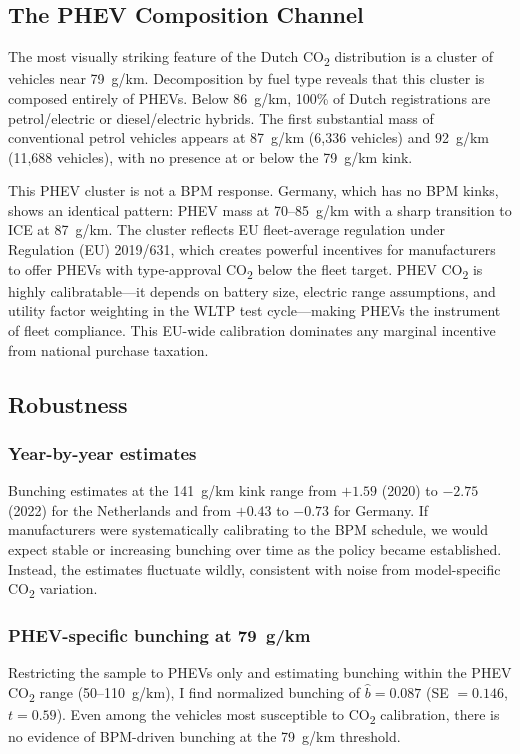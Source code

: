 \documentclass[12pt]{article}
\begin{document}


\subsection{The PHEV Composition Channel}

The most visually striking feature of the Dutch CO\textsubscript{2} distribution is a cluster of vehicles near 79~g/km. Decomposition by fuel type reveals that this cluster is composed entirely of PHEVs. Below 86~g/km, 100\% of Dutch registrations are petrol/electric or diesel/electric hybrids. The first substantial mass of conventional petrol vehicles appears at 87~g/km (6,336 vehicles) and 92~g/km (11,688 vehicles), with no presence at or below the 79~g/km kink.

This PHEV cluster is not a BPM response. Germany, which has no BPM kinks, shows an identical pattern: PHEV mass at 70--85~g/km with a sharp transition to ICE at 87~g/km. The cluster reflects EU fleet-average regulation under Regulation (EU) 2019/631, which creates powerful incentives for manufacturers to offer PHEVs with type-approval CO\textsubscript{2} below the fleet target. PHEV CO\textsubscript{2} is highly calibratable---it depends on battery size, electric range assumptions, and utility factor weighting in the WLTP test cycle---making PHEVs the instrument of fleet compliance. This EU-wide calibration dominates any marginal incentive from national purchase taxation.

\subsection{Robustness}

\subsubsection*{Year-by-year estimates} Bunching estimates at the 141~g/km kink range from $+1.59$ (2020) to $-2.75$ (2022) for the Netherlands and from $+0.43$ to $-0.73$ for Germany. If manufacturers were systematically calibrating to the BPM schedule, we would expect stable or increasing bunching over time as the policy became established. Instead, the estimates fluctuate wildly, consistent with noise from model-specific CO\textsubscript{2} variation.

\subsubsection*{PHEV-specific bunching at 79~g/km} Restricting the sample to PHEVs only and estimating bunching within the PHEV CO\textsubscript{2} range (50--110~g/km), I find normalized bunching of $\hat{b} = 0.087$ (SE $= 0.146$, $t = 0.59$). Even among the vehicles most susceptible to CO\textsubscript{2} calibration, there is no evidence of BPM-driven bunching at the 79~g/km threshold.
\end{document}
